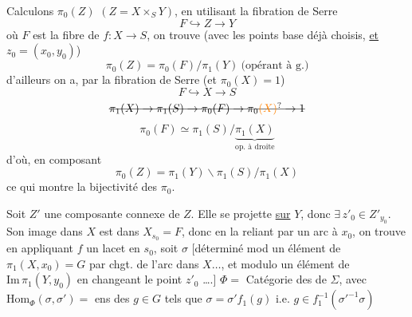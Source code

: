 Calculons $\pi_0(Z)$ $(Z=X\times_S Y)$, en utilisant la fibration de Serre
\[
 F\hookrightarrow Z\longrightarrow Y
\]
où $F$ est la fibre de $f:X\to S$, on trouve  (avec les points base déjà choisis, \uline{et} $z_0=(x_0,y_0)$)
\[
 \pi_0(Z)=\pi_0(F)/\pi_1(Y)\ \text{(opérant à g.)}
\]
d'ailleurs on a, par la fibration de Serre (et $\pi_0(X)=1$)
\[
 F\hookrightarrow X\longrightarrow S
\]
\[
 \deleted{\pi_1(X)\to\pi_1(S)\to\pi_0(F)\to\pi_0\unsure{(X)}\to1}
\]
\[
 \pi_0(F)\simeq\pi_1(S)/\underbrace{\pi_1(X)}_{\text{op. à droite}}
\]
d'où, en composant
\[
 \pi_0(Z)=\pi_1(Y)\backslash\pi_1(S)/\pi_1(X)
\]
ce qui montre la bijectivité des $\pi_0$.

 Soit $Z'$ une composante connexe de $Z$. Elle se projette \uline{sur} $Y$, donc $\exists\,z'_0\in Z'_{y_0}$. Son image dans $X$ est  dans $X_{s_0}=F$, donc
en la reliant par un arc à $x_0$, on trouve en appliquant $f$ un lacet en $s_0$, soit $\sigma$ [déterminé mod un élément de  $\pi_1(X,x_0)=G$ par chgt. de l'arc dans $X\ldots$, et modulo un élément de $\mathrm{Im}\,\pi_1(Y,y_0)$ en changeant le point $z'_0$ \ldots.]
$\Phi={}$ Catégorie des  de $\Sigma$, avec $\mathrm{Hom}_{\Phi}(\sigma,\sigma')={}$ ens des $g\in G$ tels que $\sigma=\sigma'f_1(g)$ i.e. $g\in f_1^{-1}(\sigma'^{-1}\sigma)$

